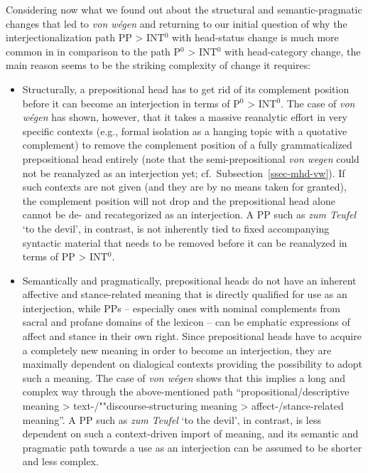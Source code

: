 \documentclass[output=paper
  ,nobabel
  ,draftmode
  ,babelshorthands
  ,colorlinks, citecolor=brown
]{langscibook}
\begin{document}
Considering now what we found out about the structural and semantic\hyp pragmatic changes that led to \emph{von wégen} and returning to our initial question of why the interjectionalization path PP > INT$^0$ with head-status change is much more common in  in comparison to the path P$^0$ > INT$^0$ with head-category change, the main reason seems to be the striking complexity of change it requires:

\begin{itemize}
\item	Structurally, a prepositional head has to get rid of its complement position before it can become an interjection in terms of P$^0$ > INT$^0$. The case of \emph{von wégen} has shown, however, that it takes a massive reanalytic effort in very specific contexts (e.g., formal isolation as a hanging topic with a quotative complement) to remove the complement position of a fully grammaticalized prepositional head entirely (note that the semi-prepositional \emph{von wegen} could not be reanalyzed as an interjection yet; cf.\ Subsection~\ref{ssec-mhd-vw}). If such contexts are not given (and they are by no means taken for granted), the complement position will not drop and the prepositional head alone cannot be de- and recategorized as an interjection. A PP such as \emph{zum Teufel} `to the devil', in contrast, is not inherently tied to fixed accompanying syntactic material that needs to be removed before it can be reanalyzed in terms of PP > INT$^0$.

\item Semantically and pragmatically,  prepositional heads do not have an inherent affective
  and stance-related meaning that is directly qualified for use as an interjection, while PPs –
  especially ones with nominal complements from sacral and profane domains of the lexicon – can
  be emphatic expressions of affect and stance in their own right. Since prepositional heads have to
  acquire a completely new meaning in order to become an interjection, they are maximally dependent
  on dialogical contexts providing the possibility to adopt such a meaning. The case of \emph{von
    wégen} shows that this implies a long and complex way through the above-mentioned path
  ``propositional/descriptive meaning > text-/""discourse\hyp structuring meaning > affect-/stance-related meaning''. A PP such as \emph{zum Teufel} `to the devil', in contrast, is less dependent on such a context-driven import of meaning, and its semantic and pragmatic path towards a use as an interjection can be assumed to be shorter and less complex.
\end{itemize}
\end{document}
